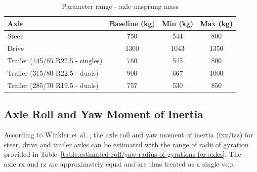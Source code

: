 \begin{table}[H]
	\centering\footnotesize
	\begin{threeparttable}

		\begin{tabulary}{\textwidth}{lccc}
			\toprule
			\textbf{Axle} & \textbf{Baseline (kg)} & \textbf{Min (kg)} & \textbf{Max (kg)} \\
			\midrule
			Steer & 750   & 544   & 800 \\
			Drive & 1300  & 1043   & 1350 \\
			Trailer (445/65 R22.5 - singles) & 760   & 545   & 800 \\
			Trailer (315/80 R22.5 - duals) & 900   & 667   & 1000 \\
			Trailer (285/70 R19.5 - duals) & 757   & 530   & 850 \\
			\bottomrule
		\end{tabulary}

		\caption{Parameter range - axle unsprung mass}
		\label{table:pr-axle-unsprung-mass}


	\end{threeparttable}
\end{table}

\subsection{Axle Roll and Yaw Moment of Inertia}\label{section:pr-axle-roll-yaw-inertia}
According to Winkler et al. \cite{Winkler2011}, the axle roll and yaw moment of inertia (\gls{ixx}/\gls{izz}) for steer, drive and trailer axles can be estimated with the range of radii of gyration provided in Table~\ref{table:estimated roll/yaw radius of gyrations for axles}. The axle \gls{rx} and \gls{rz} are approximately equal and are thus treated as a single \gls{vdp}.

